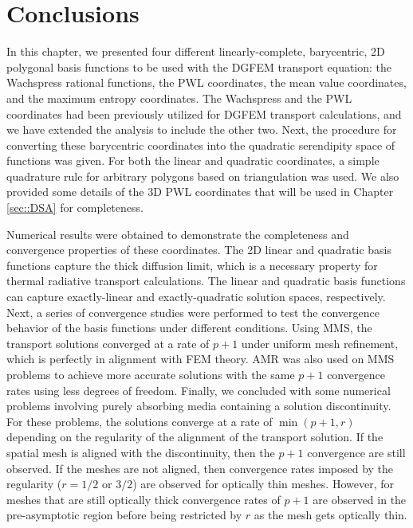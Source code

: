 \section{Conclusions}
\label{sec::BF_Conclusions}

In this chapter, we presented four different linearly-complete, barycentric, 2D polygonal basis functions to be used with the DGFEM transport equation: the Wachspress rational functions, the PWL coordinates, the mean value coordinates, and the maximum entropy coordinates. The Wachspress and the PWL coordinates had been previously utilized for DGFEM transport calculations, and we have extended the analysis to include the other two. Next, the procedure for converting these barycentric coordinates into the quadratic serendipity space of functions was given. For both the linear and quadratic coordinates, a simple quadrature rule for arbitrary polygons based on triangulation was used. We also provided some details of the 3D PWL coordinates that will be used in Chapter \ref{sec::DSA} for completeness.

Numerical results were obtained to demonstrate the completeness and convergence properties of these coordinates. The 2D linear and quadratic basis functions capture the thick diffusion limit, which is a necessary property for thermal radiative transport calculations. The linear and quadratic basis functions can capture exactly-linear and exactly-quadratic solution spaces, respectively. Next, a series of convergence studies were performed to test the convergence behavior of the basis functions under different conditions. Using MMS, the transport solutions converged at a rate of $p+1$ under uniform mesh refinement, which is perfectly in alignment with FEM theory. AMR was also used on MMS problems to achieve more accurate solutions with the same $p+1$ convergence rates using less degrees of freedom. Finally, we concluded with some numerical problems involving purely absorbing media containing a solution discontinuity. For these problems, the solutions converge at a rate of $\min ( p+1 , r)$ depending on the regularity of the alignment of the transport solution. If the spatial mesh is aligned with the discontinuity, then the $p+1$ convergence are still observed. If the meshes are not aligned, then convergence rates imposed by the regularity ($r=1/2$ or $3/2$) are observed for optically thin meshes. However, for meshes that are still optically thick convergence rates of $p+1$ are observed in the pre-asymptotic region before being restricted by $r$ as the mesh gets optically thin.



